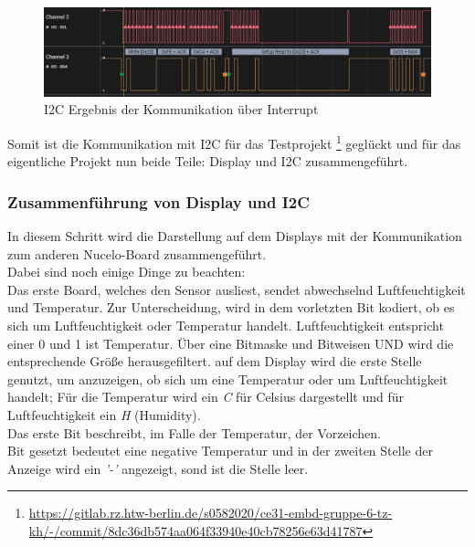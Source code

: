 \documentclass[11pt,a4paper,titlepage]{article}
\begin{document}
\begin{figure}[h]
    \begin{center}
        \includegraphics[width=\textwidth]{Bilder/i2c_interrupt.PNG}
        \caption{I2C Ergebnis der Kommunikation über Interrupt}
        \label{i2c-interrupt}
    \end{center}
\end{figure}

Somit ist die Kommunikation mit I2C für das Testprojekt
\footnote{\url{https://gitlab.rz.htw-berlin.de/s0582020/ce31-embd-gruppe-6-tz-kh/-/commit/8dc36db574aa064f33940e40cb78256e63d41787}}
geglückt und für das eigentliche Projekt nun beide Teile: Display und I2C zusammengeführt.


\subsubsection{Zusammenführung von Display und I2C}
In diesem Schritt wird die Darstellung auf dem Displays mit der Kommunikation zum anderen Nucelo-Board zusammengeführt.\\

Dabei sind noch einige Dinge zu beachten:\\
Das erste Board, welches den Sensor ausliest, sendet abwechselnd Luftfeuchtigkeit und Temperatur.
Zur Unterscheidung, wird in dem vorletzten Bit kodiert, ob es sich um Luftfeuchtigkeit oder Temperatur handelt.
Luftfeuchtigkeit entspricht einer 0 und 1 ist Temperatur.
Über eine Bitmaske und Bitweisen UND wird die entsprechende Größe herausgefiltert.
auf dem Display wird die erste Stelle genutzt, um anzuzeigen, ob sich um eine Temperatur oder um Luftfeuchtigkeit handelt;
Für die Temperatur wird ein \textit{C} für Celsius dargestellt und für Luftfeuchtigkeit ein \textit{H} (Humidity).\\

Das erste Bit beschreibt, im Falle der Temperatur, der Vorzeichen.\\
Bit gesetzt bedeutet eine negative Temperatur und in der zweiten Stelle der Anzeige wird ein \textit{'-'} angezeigt,
sond ist die Stelle leer.\\
\end{document}
